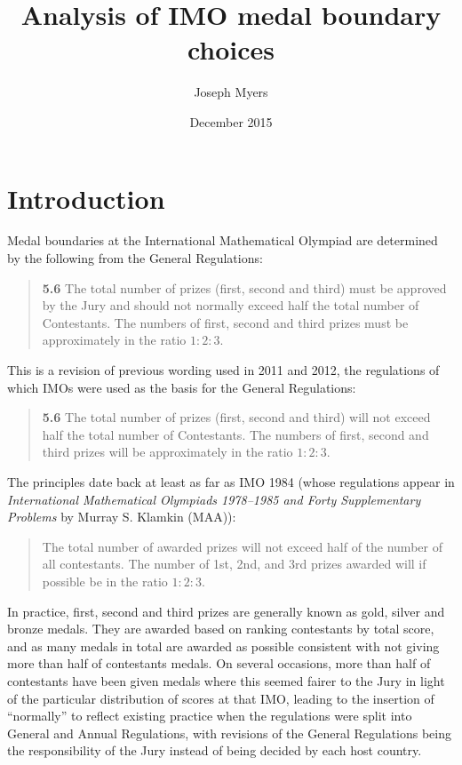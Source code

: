 \documentclass[a4paper,11pt]{article}
\begin{document}
\title{Analysis of IMO medal boundary choices}
\author{Joseph Myers}
\date{December 2015}
\maketitle

\section*{Introduction}

Medal boundaries at the International Mathematical Olympiad are
determined by the following from the General Regulations:

\begin{quote}
\textbf{5.6} The total number of prizes (first, second and third) must
be approved by the Jury and should not normally exceed half the total
number of Contestants. The numbers of first, second and third prizes
must be approximately in the ratio $1:2:3$.
\end{quote}

This is a revision of previous wording used in 2011 and 2012, the
regulations of which IMOs were used as the basis for the General
Regulations:

\begin{quote}
\textbf{5.6} The total number of prizes (first, second and third) will
not exceed half the total number of Contestants. The numbers of first,
second and third prizes will be approximately in the ratio $1:2:3$.
\end{quote}

The principles date back at least as far as IMO 1984 (whose
regulations appear in \textit{International Mathematical Olympiads
  1978--1985 and Forty Supplementary Problems} by Murray S. Klamkin
(MAA)):

\begin{quote}
The total number of awarded prizes will not exceed half of the number
of all contestants.  The number of 1st, 2nd, and 3rd prizes awarded
will if possible be in the ratio $1:2:3$.
\end{quote}

In practice, first, second and third prizes are generally known as
gold, silver and bronze medals.  They are awarded based on ranking
contestants by total score, and as many medals in total are awarded as
possible consistent with not giving more than half of contestants
medals.  On several occasions, more than half of contestants have been
given medals where this seemed fairer to the Jury in light of the
particular distribution of scores at that IMO, leading to the
insertion of ``normally'' to reflect existing practice when the
regulations were split into General and Annual Regulations, with
revisions of the General Regulations being the responsibility of the
Jury instead of being decided by each host country.
\end{document}

